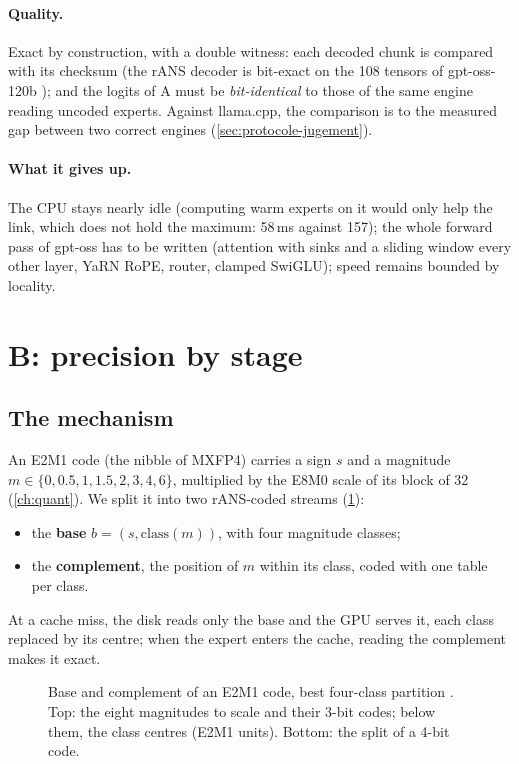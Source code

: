 \paragraph{Quality.} Exact by construction, with a double witness: each decoded chunk is compared with its checksum (the rANS decoder is bit-exact on the 108 tensors of gpt-oss-120b \mes); and the logits of A must be \emph{bit-identical} to those of the same engine reading uncoded experts. Against llama.cpp, the comparison is to the measured gap between two correct engines (\cref{sec:protocole-jugement}).

\paragraph{What it gives up.} The CPU stays nearly idle (computing warm experts on it would only help the link, which does not hold the maximum: 58\,ms against 157); the whole forward pass of gpt-oss has to be written (attention with sinks and a sliding window every other layer, YaRN RoPE, router, clamped SwiGLU); speed remains bounded by locality.

\section{B: precision by stage}\label{sec:archi-b}

\subsection{The mechanism}

An E2M1 code (the nibble of MXFP4) carries a sign $s$ and a magnitude $m \in \{0, 0.5, 1, 1.5, 2, 3, 4, 6\}$, multiplied by the E8M0 scale of its block of 32 (\cref{ch:quant}). We split it into two rANS-coded streams (\cref{fig:base-complement}):
\begin{itemize}
\item the \textbf{base} $b = (s, \mathrm{class}(m))$, with four magnitude classes;
\item the \textbf{complement}, the position of $m$ within its class, coded with one table per class.
\end{itemize}
At a cache miss, the disk reads only the base and the GPU serves it, each class replaced by its centre; when the expert enters the cache, reading the complement makes it exact.

\begin{figure}[ht]
\centering
\SchemaBaseComplement
\caption[Base and complement of an E2M1 code]{Base and complement of an E2M1 code, best four-class partition \mes. Top: the eight magnitudes to scale and their 3-bit codes; below them, the class centres (E2M1 units). Bottom: the split of a 4-bit code.}
\label{fig:base-complement}
\end{figure}

